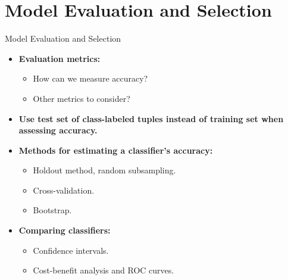 \section{Model Evaluation and Selection}

\begin{frame}{Model Evaluation and Selection}
  \begin{itemize}
  \item \textbf{Evaluation metrics:}
    \begin{itemize}
    \item How can we measure accuracy?
    \item Other metrics to consider?
    \end{itemize}
  \item \textbf{Use {\color{airforceblue}test} set of class-labeled tuples instead of training set when assessing accuracy.}
  \item \textbf{Methods for estimating a classifier's accuracy:}
    \begin{itemize}
    \item Holdout method, random subsampling.
    \item Cross-validation.
    \item Bootstrap.
    \end{itemize}
  \item \textbf{Comparing classifiers:}
    \begin{itemize}
    \item Confidence intervals.
    \item Cost-benefit analysis and ROC curves.
    \end{itemize}
  \end{itemize}
\end{frame}

